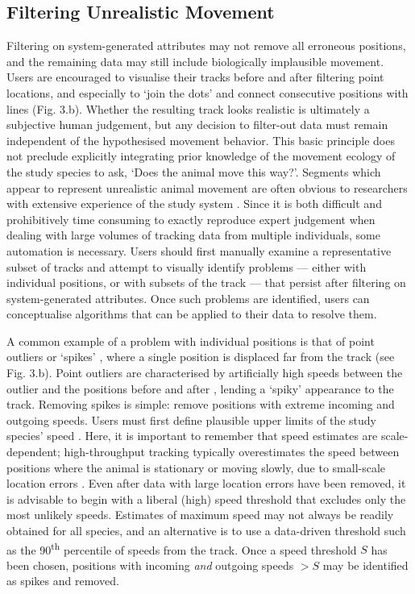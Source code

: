 \begin{refsection}[sorting=nyt]
    \subsection*{Filtering Unrealistic Movement}

    Filtering on system-generated attributes may not remove all erroneous positions, and the remaining data may still include biologically implausible movement.
    Users are encouraged to visualise their tracks before and after filtering point locations, and especially to `join the dots' and connect consecutive positions with lines (Fig. 3.b).
    Whether the resulting track looks realistic is ultimately a subjective human judgement, but any decision to filter-out data must remain independent of the hypothesised movement behavior.
    This basic principle does not preclude explicitly integrating prior knowledge of the movement ecology of the study species to ask, `Does the animal move this way?'.
    Segments which appear to represent unrealistic animal movement are often obvious to researchers with extensive experience of the study system \citep[the non-movement approach; see][]{bjorneraas2010}.
    Since it is both difficult and prohibitively time consuming to exactly reproduce expert judgement when dealing with large volumes of tracking data from multiple individuals, some automation is necessary.
    Users should first manually examine a representative subset of tracks and attempt to visually identify problems --- either with individual positions, or with subsets of the track --- that persist after filtering on system-generated attributes.
    Once such problems are identified, users can conceptualise algorithms that can be applied to their data to resolve them.

    A common example of a problem with individual positions is that of point outliers or `spikes' \citep{bjorneraas2010}, where a single position is displaced far from the track (see Fig. 3.b).
    Point outliers are characterised by artificially high speeds between the outlier and the positions before and after \citep[called incoming and outgoing speed, respectively;][]{bjorneraas2010}, lending a `spiky' appearance to the track.
    Removing spikes is simple: remove positions with extreme incoming and outgoing speeds.
    Users must first define plausible upper limits of the study species' speed \citep{calenge2009, seidel2018}.
    Here, it is important to remember that speed estimates are scale-dependent; high-throughput tracking typically overestimates the speed between positions where the animal is stationary or moving slowly, due to small-scale location errors \citep{ranacher2016, noonan2019}. 
    Even after data with large location errors have been removed, it is advisable to begin with a liberal (high) speed threshold that excludes only the most unlikely speeds.
    Estimates of maximum speed may not always be readily obtained for all species, and an alternative is to use a data-driven threshold such as the 90\textsuperscript{th} percentile of speeds from the track.
    Once a speed threshold $S$ has been chosen, positions with incoming \textit{and} outgoing speeds $> S$ may be identified as spikes and removed.


\end{refsection}
